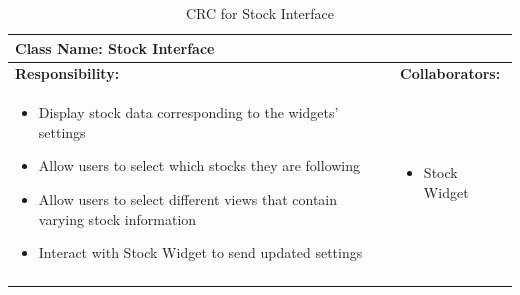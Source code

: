 \documentclass[]{article}
\begin{document}
\begin{longtable}{| p{} | p{} |}
	\hline
	\multicolumn{2}{|l|}{\textbf{Class Name: Stock Interface}} \\
	\hline
	\textbf{Responsibility:} & \textbf{Collaborators:} \\
	\hline
	\begin{itemize}
		\item Display stock data corresponding to the widgets' settings
		\item Allow users to select which stocks they are following
		\item Allow users to select different views that contain varying stock information
		\item Interact with Stock Widget to send updated settings
    \end{itemize} & 
	\begin{itemize}
		\item Stock Widget
	\end{itemize} \\
	\hline
	\caption{CRC for Stock Interface}
\end{longtable}
\end{document}
